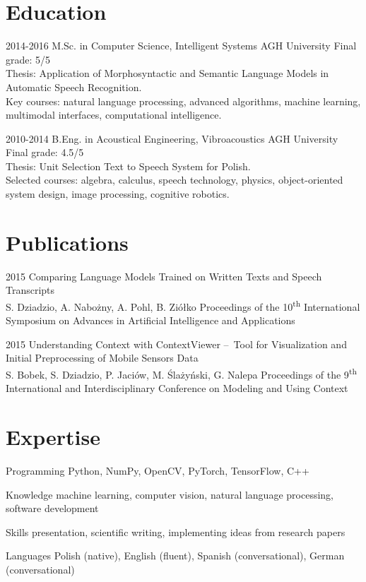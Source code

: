 \documentclass[]{friggeri-cv_osx}
\begin{document}
\section{Education}
\begin{entrylist}
\entry
{2014-2016}
{M.Sc. in Computer Science, Intelligent Systems}
{AGH University}
{Final grade: 5/5\\
Thesis: Application of Morphosyntactic and Semantic Language Models in Automatic Speech Recognition.\\
Key courses: natural language processing, advanced algorithms, machine learning, multimodal interfaces, computational intelligence.}

\entry
{2010-2014}
{B.Eng. in Acoustical Engineering, Vibroacoustics}
{AGH University}
{Final grade: 4.5/5\\
Thesis: Unit Selection Text to Speech System for Polish.\\
Selected courses: algebra, calculus, speech technology, physics, object-oriented system design, image processing, cognitive robotics.}
\end{entrylist}


\newpage
\section{Publications}
\begin{entrylist}
\entry
{2015}
{Comparing Language Models Trained on Written Texts and Speech Transcripts\\}
{S. Dziadzio, A. Nabożny, A. Pohl, B. Ziółko}
{Proceedings of the 10\textsuperscript{th} International Symposium on Advances in Artificial Intelligence and Applications\\}

\entry
{2015}
{Understanding Context with ContextViewer – Tool for Visualization and Initial Preprocessing of Mobile Sensors Data\\}
{S. Bobek, S. Dziadzio, P. Jaciów, M. Ślażyński, G. Nalepa}
{Proceedings of the 9\textsuperscript{th} International and Interdisciplinary Conference on Modeling and Using Context}
\end{entrylist}

\section{Expertise}
\begin{entrylist}
\entry
{}
{Programming}
{}
{Python, NumPy, OpenCV, PyTorch, TensorFlow, C++}

\entry
{}
{Knowledge}
{}
{machine learning, computer vision, natural language processing, software development}

\entry
{}
{Skills}
{}
{presentation, scientific writing, implementing ideas from research papers}

\entry
{}
{Languages}
{}
{Polish (native), English (fluent), Spanish (conversational), German (conversational)}
\end{entrylist}
\end{document}
